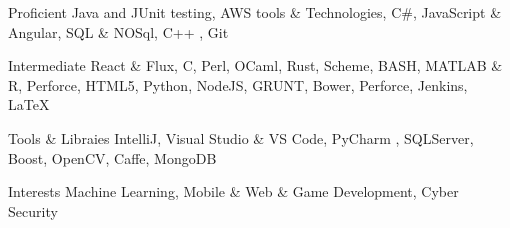 

\begin{cvskills}

  \cvskill
    {Proficient} %
    {Java and JUnit testing, AWS tools \& Technologies, C\#, JavaScript \& Angular, SQL \& NOSql, C++ ,  Git} %

  \cvskill
    {Intermediate} %
    {React \& Flux, C, Perl, OCaml, Rust, Scheme, BASH, MATLAB \& R, Perforce, HTML5, Python, NodeJS, GRUNT, Bower, Perforce, Jenkins, \LaTeX } %
	
  \cvskill
	{Tools \& Libraies} %
	{IntelliJ, Visual Studio \& VS Code, PyCharm , SQLServer, Boost, OpenCV, Caffe, MongoDB} %
	
  \cvskill
    {Interests} %
    {Machine Learning, Mobile \& Web \& Game Development, Cyber Security} %
    
  
   
    

\end{cvskills}
